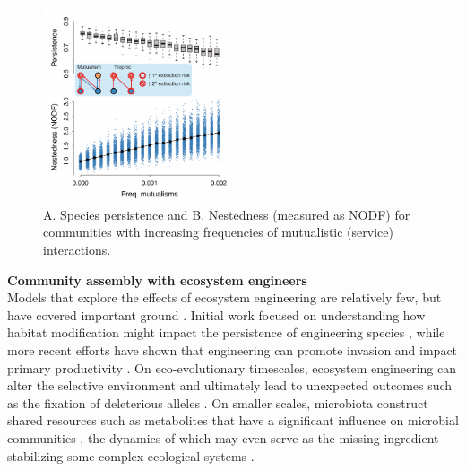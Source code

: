 \documentclass[9pt,twocolumn,twoside]{pnas-new}
\begin{document}
\begin{figure}
\centering
\includegraphics[width=0.5\textwidth]{fig_nested.pdf}
\caption{
A. Species persistence and
B. Nestedness (measured as NODF) for communities with increasing frequencies of mutualistic (service) interactions.
}
\label{fig:nest}
\end{figure}

\noindent \textbf{Community assembly with ecosystem engineers} \\
Models that explore the effects of ecosystem engineering are relatively few, but have covered important ground \cite{Hastings2007,OdlingSmee2013}.
Initial work focused on understanding how habitat modification might impact the persistence of engineering species \cite{Gurney1996}, while more recent efforts have shown that engineering can promote invasion \cite{Cuddington2004} and impact primary productivity \cite{Wright2004}.
On eco-evolutionary timescales, ecosystem engineering can alter the selective environment \cite{Krakauer2009,OdlingSmee2013} and ultimately lead to unexpected outcomes such as the fixation of deleterious alleles \cite{Laland1999}.
On smaller scales, microbiota construct shared resources such as metabolites that have a significant influence on microbial communities \cite{Kallus2017}, the dynamics of which may even serve as the missing ingredient stabilizing some complex ecological systems \cite{Muscarella2017}.
\end{document}
